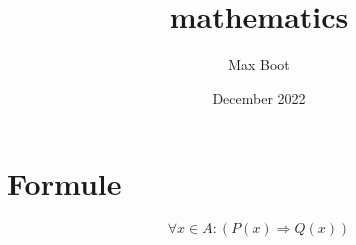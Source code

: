 \documentclass{article}
\title{mathematics}
\author{Max Boot}
\date{December 2022}
\begin{document}
\maketitle

\section{Formule}

\begin{equation}
    \forall x \in A : (P(x) \Rightarrow Q(x))
\end{equation}
\end{document}

